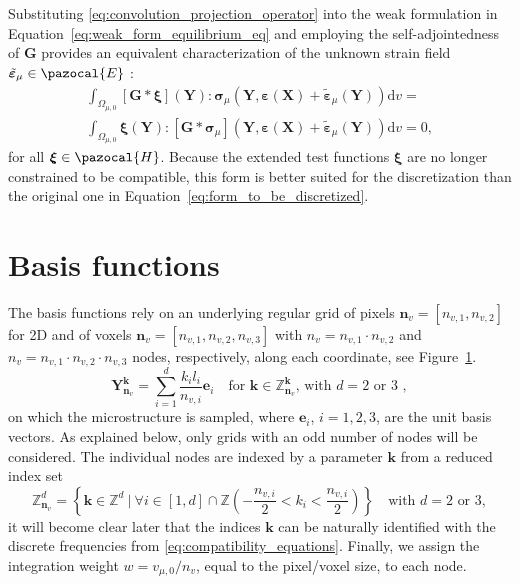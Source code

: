 Substituting \eqref{eq:convolution_projection_operator} into the weak formulation in Equation~\eqref{eq:weak_form_equilibrium_eq} and employing the self-adjointedness of \(\bm G\) provides an equivalent characterization of the unknown strain field \(\tilde{\bm \varepsilon}_\mu \in \pazocal{E}\) :
\begin{multline} \label{eq:form_to_be_discretized}
\int_{\Omega_{\mu,0}}[\bm{G} * \bm{\xi}](\bm{Y}): \bm{\sigma}_\mu\left(\bm{Y}, \bm \varepsilon(\bm X)+\tilde{\bm\varepsilon}_\mu(\bm Y)\right) \mathrm{d} v=\\ \int_{\Omega_{\mu,0}}
\bm \xi(\bm Y): [\bm{G} * \bm{\sigma}_\mu]\left(\bm Y, \bm \varepsilon(\bm X)+\tilde{\bm\varepsilon}_\mu(\bm{Y})\right) \mathrm{d} v=0,
\end{multline}
for all \(\bm \xi \in \pazocal{H}\).
Because the extended test functions \(\bm \xi\) are no longer constrained to be compatible, this form is better suited for the discretization than the original one in Equation~\eqref{eq:form_to_be_discretized}.

\section{Basis functions}

The basis functions rely on an underlying regular grid of pixels \(\bm n_v = [n_{v,1}, n_{v,2}]\) for 2D and of voxels \(\bm n_v = [n_{v,1}, n_{v,2}, n_{v,3}]\) with \(n_v= n_{v,1} \cdot n_{v,2}\) and \(n_v=n_{v,1}\cdot n_{v,2}\cdot n_{v,3}\) nodes, respectively, along each coordinate, see Figure~\ref{}.
\begin{equation}
\bm Y_{\bm n_v}^{\bm  k}=\sum_{i=1}^d \frac{ k_{i} l_{i}}{n_{v,i}} \bm e_{i}\quad \text{for \(\bm k \in \mathbb Z^{\bm k}_{\bm n_v}\), with \(d=2\) or 3 },
\end{equation}
on which the microstructure is sampled, where \(\bm e_i\), \(i=1,2,3\), are the unit basis vectors.
As explained below, only grids with an odd number of nodes will be considered.
The individual nodes are indexed by a parameter \(\bm k\) from a reduced index set
\begin{equation}
\mathbb{Z}_{\bm n_v}^{d}=\left\{\bm{ k} \in \mathbb{Z}^{d}\ |\ \forall i \in [1,d]\cap \mathbb Z \left(-\frac{n_{v,i}}{2}< k_{i}<\frac{n_{v,i}}{2}\right) \right\}\quad \text{with \(d=2\) or 3},
\end{equation}
it will become clear later that the indices \(\bm  k\) can be naturally identified with the discrete frequencies from \eqref{eq:compatibility_equations}.
Finally, we assign the integration weight \(w=v_{\mu,0} /n_v\), equal to the pixel/voxel size, to each node.

